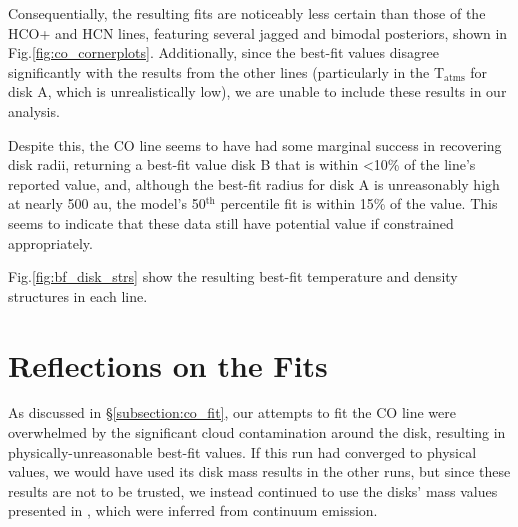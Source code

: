 






Consequentially, the resulting fits are noticeably less certain than those of the HCO+ and HCN lines, featuring several jagged and bimodal posteriors, shown in Fig.\ref{fig:co_cornerplots}. Additionally, since the best-fit values disagree significantly with the results from the other lines (particularly in the T$_\text{atms}$ for disk A, which is unrealistically low), we are unable to include these results in our analysis.

Despite this, the CO line seems to have had some marginal success in recovering disk radii, returning a best-fit value disk B that is within \textless10\% of the \hco line's reported value, and, although the best-fit radius for disk A is unreasonably high at nearly 500 au, the model's 50$^\text{th}$ percentile fit is within 15\% of the \hco value. This seems to indicate that these data still have potential value if constrained appropriately.

Fig.\ref{fig:bf_disk_strs} show the resulting best-fit temperature and density structures in each line.





\section{Reflections on the Fits}

As discussed in \S\ref{subsection:co_fit}, our attempts to fit the CO line were overwhelmed by the significant cloud contamination around the disk, resulting in physically-unreasonable best-fit values. If this run had converged to physical values, we would have used its disk mass results in the other runs, but since these results are not to be trusted, we instead continued to use the disks' mass values presented in \citet{Williams2014}, which were inferred from continuum emission.

